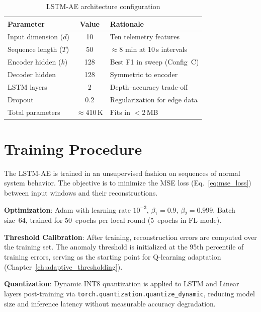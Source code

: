 \begin{table}[H]
    \centering
    \small
    \begin{tabular}{|l|c|l|}
        \hline
        \textbf{Parameter} & \textbf{Value} & \textbf{Rationale} \\
        \hline
        Input dimension ($d$) & 10 & Ten telemetry features \\
        \hline
        Sequence length ($T$) & 50 & $\approx$8 min at 10\,s intervals \\
        \hline
        Encoder hidden ($k$) & 128 & Best F1 in sweep (Config~C) \\
        \hline
        Decoder hidden & 128 & Symmetric to encoder \\
        \hline
        LSTM layers & 2 & Depth--accuracy trade-off \\
        \hline
        Dropout & 0.2 & Regularization for edge data \\
        \hline
        Total parameters & $\approx$410\,K & Fits in $<$2\,MB \\
        \hline
    \end{tabular}
    \caption{LSTM-AE architecture configuration}
    \label{tab:model_config}
\end{table}

\section{Training Procedure}
\label{sec:training_procedure}

The LSTM-AE is trained in an unsupervised fashion on sequences of normal
system behavior. The objective is to minimize the MSE loss
(Eq.~\ref{eq:mse_loss}) between input windows and their reconstructions.

\textbf{Optimization}: Adam \cite{kingma2015adam} with learning rate
$10^{-3}$, $\beta_1 = 0.9$, $\beta_2 = 0.999$. Batch size~64, trained
for 50~epochs per local round (5~epochs in FL mode).

\textbf{Threshold Calibration}: After training, reconstruction errors
are computed over the training set. The anomaly threshold is initialized
at the 95th percentile of training errors, serving as the starting point
for Q-learning adaptation (Chapter~\ref{ch:adaptive_thresholding}).

\textbf{Quantization}: Dynamic INT8 quantization is applied to LSTM and
Linear layers post-training via \texttt{torch.quantization.quantize\_dynamic},
reducing model size and inference latency without measurable accuracy
degradation.
